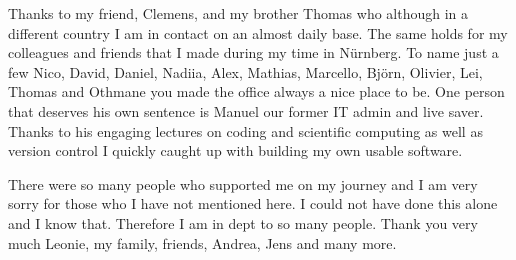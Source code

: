 Thanks to my friend, Clemens, and my brother Thomas who although in a different country I am in contact on an almost daily base.
The same holds for my colleagues and friends that I made during my time in Nürnberg.
To name just a few Nico, David, Daniel, Nadiia, Alex, Mathias, Marcello, Björn, Olivier, Lei, Thomas and Othmane you made the office always a nice place to be.
One person that deserves his own sentence is Manuel our former IT admin and live saver.
Thanks to his engaging lectures on coding and scientific computing as well as version control I quickly caught up with building my own usable software. 

There were so many people who supported me on my journey and I am very sorry for those who I have not mentioned here.
I could not have done this alone and I know that. 
Therefore I am in dept to so many people.
Thank you very much Leonie, my family, friends, Andrea, Jens and many more.